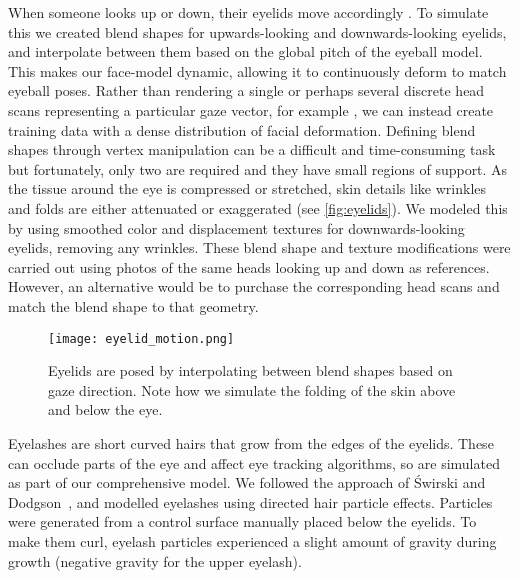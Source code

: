 
When someone looks up or down, their eyelids move accordingly \cite{liversedge2011oxford}.
To simulate this we created blend shapes for upwards-looking and downwards-looking eyelids, and interpolate between them based on the global pitch of the eyeball model.
This makes our face-model dynamic, allowing it to continuously deform to match eyeball poses.
Rather than rendering a single or perhaps several discrete head scans representing a particular gaze vector, for example \cite{sugano2014learning}, we can instead create training data with a dense distribution of facial deformation.
Defining blend shapes through vertex manipulation can be a difficult and time-consuming task but fortunately, only two are required and they have small regions of support.
As the tissue around the eye is compressed or stretched, skin details like wrinkles and folds are either attenuated or exaggerated (see \autoref{fig:eyelids}).
We modeled this by using smoothed color and displacement textures for downwards-looking eyelids, removing any wrinkles.
These blend shape and texture modifications were carried out using photos of the same heads looking up and down as references.
However, an alternative would be to purchase the corresponding head scans and match the blend shape to that geometry.

\begin{figure}
    \texttt{[image: eyelid\_motion.png]}
    \caption{Eyelids are posed by interpolating between blend shapes based on gaze direction. Note how we simulate the folding of the skin above and below the eye.}
    \label{fig:eyelids}
\end{figure}


Eyelashes are short curved hairs that grow from the edges of the eyelids.
These can occlude parts of the eye and affect eye tracking algorithms, so are simulated as part of our comprehensive model.
We followed the approach of {\'S}wirski and Dodgson~\cite{swirski2014rendering}, and modelled eyelashes using directed hair particle effects.
Particles were generated from a control surface manually placed below the eyelids.
To make them curl, eyelash particles experienced a slight amount of gravity during growth (negative gravity for the upper eyelash).


